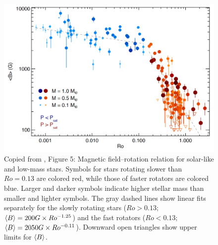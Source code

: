 \documentclass[12pt]{article} %
\begin{document}
\begin{figure}\label{fig:arr}
	\centering
	\includegraphics[width=6.5in]{ARR.png}
	\caption{Copied from \citet{Reiners2022}, Figure 5: Magnetic field–rotation relation for solar-like and low-mass stars. Symbols for stars rotating slower than $Ro=0.13$ are colored red, while those of faster rotators are colored blue. Larger and darker symbols indicate higher stellar mass than smaller and lighter symbols.  The gray dashed lines show linear fits separately for the slowly rotating stars ($Ro>0.13$;  $\left\langle B\right\rangle=200G\times Ro^{-1.25}$) and the fast rotators ($Ro<0.13$; $\left\langle B\right\rangle=2050 G \times Ro^{-0.11}$). Downward open triangles show upper limits for $\left\langle B\right\rangle$.}
\end{figure}
\end{document}
